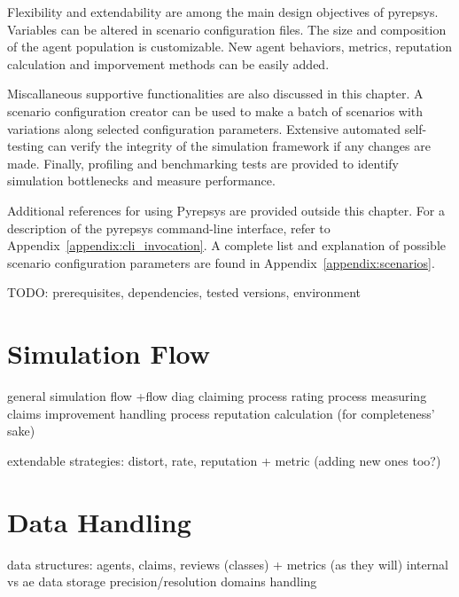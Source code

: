 \documentclass[%
    ]{\PathToTumTemplate/thesis/tum_thesis}
\begin{document}
Flexibility and extendability are among the main design objectives of pyrepsys.
Variables can be altered in scenario configuration files.
The size and composition of the agent population is customizable.
New agent behaviors, metrics, reputation calculation and imporvement methods can be easily added.

Miscallaneous supportive functionalities are also discussed in this chapter.
A scenario configuration creator can be used to make a batch of scenarios with variations along selected configuration parameters.
Extensive automated self-testing can verify the integrity of the simulation framework if any changes are made.
Finally, profiling and benchmarking tests are provided to identify simulation bottlenecks and measure performance.

Additional references for using Pyrepsys are provided outside this chapter.
For a description of the pyrepsys command-line interface, refer to Appendix~\ref{appendix:cli_invocation}.
A complete list and explanation of possible scenario configuration parameters are found in Appendix~\ref{appendix:scenarios}.

TODO: prerequisites, dependencies, tested versions, environment





\section{Simulation Flow}\label{sec:impl_simulation}

general simulation flow +flow diag
claiming process
rating process
measuring claims
improvement handling process
reputation calculation (for completeness' sake)

extendable strategies: distort, rate, reputation + metric (adding new ones too?)


\section{Data Handling}\label{sec:impl_data}
data structures: agents, claims, reviews (classes) + metrics (as they will)
internal vs ae data storage
precision/resolution domains handling
\end{document}
